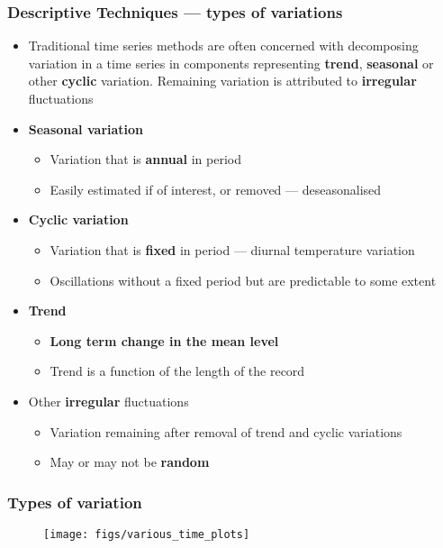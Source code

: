 \documentclass{beamer}
\begin{document}
\begin{frame}
\frametitle{Descriptive Techniques --- types of variations}
\small
\begin{itemize}
    \item Traditional time series methods are often concerned with \alert{decomposing} variation in a time series in components representing \textbf{trend}, \textbf{seasonal} or other \textbf{cyclic} variation. Remaining variation is attributed to \textbf{irregular} fluctuations
    \item \textbf{Seasonal variation}
    \begin{itemize}
        \item Variation that is \textbf{annual} in period
        \item Easily estimated if of interest, or removed --- \alert{deseasonalised}
    \end{itemize}
    \item \textbf{Cyclic variation}
    \begin{itemize}
        \item Variation that is \textbf{fixed} in period --- diurnal temperature variation
        \item Oscillations without a fixed period but are predictable to some extent
    \end{itemize}
    \item \textbf{Trend}
    \begin{itemize}
        \item \textbf{Long term change in the mean level}
        \item Trend is a function of the length of the record
    \end{itemize}
    \item Other \textbf{irregular} fluctuations
    \begin{itemize}
        \item Variation remaining after removal of trend and cyclic variations
        \item May or may not be \textbf{random}
    \end{itemize}
\end{itemize}
\normalsize
\end{frame}

\begin{frame}
\frametitle{Types of variation}
\begin{figure}
    \centering
    \texttt{[image: figs/various\_time\_plots]}
\end{figure}
\end{frame}
\end{document}

